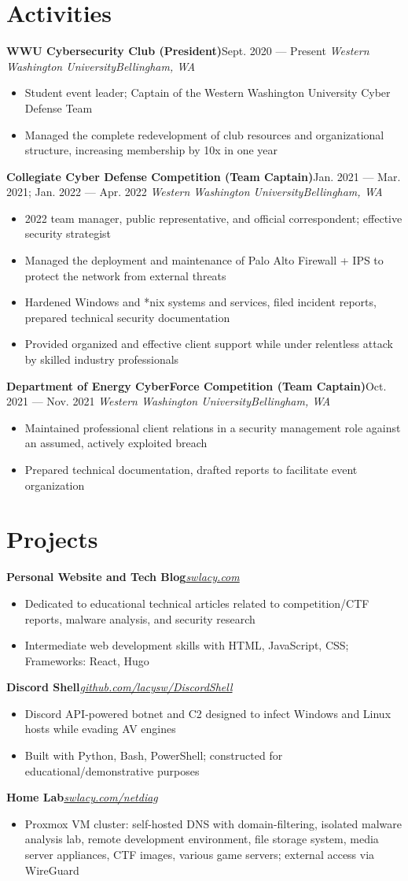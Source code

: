 \documentclass{article}
\newcommand{\topLevelItem}[4]{
    \textbf{#1}\hfill #4\newline
    \emph{#2\hfill #3}\newline
    \vspace{-18pt}\begin{itemize}
}
\newcommand{\topLevelProjectItem}[2]{
    \textbf{#1}\hfill \emph{#2}\newline
    \vspace{-18pt}\begin{itemize}
}
\newcommand{\topLevelItemEnd}{\end{itemize}\vspace{5pt}}
\newcommand{\lowLevelItem}[1]{
    \item\small{#1}\vspace{-8pt}
}
\begin{document}
    \section*{Activities}
        \topLevelItem{WWU Cybersecurity Club (President)}{Western Washington University}{Bellingham, WA}{Sept. 2020 — Present}
            \lowLevelItem{Student event leader; Captain of the Western Washington University Cyber Defense Team}
            \lowLevelItem{Managed the complete redevelopment of club resources and organizational structure, increasing membership by 10x in one year}
        \topLevelItemEnd
        \topLevelItem{Collegiate Cyber Defense Competition (Team Captain)}{Western Washington University}{Bellingham, WA}{Jan. 2021 — Mar. 2021; Jan. 2022 — Apr. 2022}
            \lowLevelItem{2022 team manager, public representative, and official correspondent; effective security strategist}
            \lowLevelItem{Managed the deployment and maintenance of Palo Alto Firewall + IPS to protect the network from external threats}
            \lowLevelItem{Hardened Windows and *nix systems and services, filed incident reports, prepared technical security documentation}
            \lowLevelItem{Provided organized and effective client support while under relentless attack by skilled industry professionals}
        \topLevelItemEnd
        \topLevelItem{Department of Energy CyberForce Competition (Team Captain)}{Western Washington University}{Bellingham, WA}{Oct. 2021 — Nov. 2021}
            \lowLevelItem{Maintained professional client relations in a security management role against an assumed, actively exploited breach}
            \lowLevelItem{Prepared technical documentation, drafted reports to facilitate event organization}
        \topLevelItemEnd
        
    \section*{Projects}
        \topLevelProjectItem{Personal Website and Tech Blog}{\href{https://swlacy.com}{swlacy.com}}
            \lowLevelItem{Dedicated to educational technical articles related to competition/CTF reports, malware analysis, and security research}
            \lowLevelItem{Intermediate web development skills with HTML, JavaScript, CSS; Frameworks: React, Hugo}
        \topLevelItemEnd
        \topLevelProjectItem{Discord Shell}{\href{https://github.com/lacysw/DiscordShell}{github.com/lacysw/DiscordShell}}
            \lowLevelItem{Discord API-powered botnet and C2 designed to infect Windows and Linux hosts while evading AV engines}
            \lowLevelItem{Built with Python, Bash, PowerShell; constructed for educational/demonstrative purposes}
        \topLevelItemEnd
        \topLevelProjectItem{Home Lab}{\href{https://github.com/lacysw/DiscordShell}{\href{https://swlacy.com/netdiag}{swlacy.com/netdiag}}}
            \lowLevelItem{Proxmox VM cluster: self-hosted DNS with domain-filtering, isolated malware analysis lab, remote development environment, file storage system, media server appliances, CTF images, various game servers; external access via WireGuard}
        \topLevelItemEnd
\end{document}
